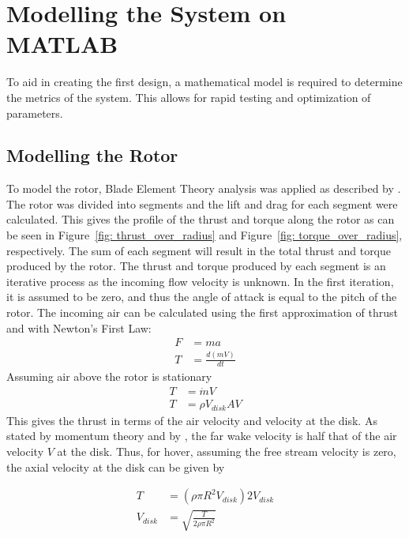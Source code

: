 \chapter{Modelling the System on MATLAB} \label{sec: MATLAB_Model}
    To aid in creating the first design, a mathematical model is required to determine the metrics of the system. This allows for rapid testing and optimization of parameters. 

    \section{Modelling the Rotor}
        To model the rotor, Blade Element Theory analysis was applied as described by \cite{blade_element_theory_2024}. The rotor was divided into segments and the lift and drag for each segment were calculated. This gives the profile of the thrust and torque along the rotor as can be seen in Figure~\ref{fig: thrust_over_radius} and Figure~\ref{fig: torque_over_radius}, respectively. The sum of each segment will result in the total thrust and torque produced by the rotor.
        The thrust and torque produced by each segment is an iterative process as the incoming flow velocity is unknown. In the first iteration, it is assumed to be zero, and thus the angle of attack is equal to the pitch of the rotor. The incoming air can be calculated using the first approximation of thrust and with Newton's First Law:
        \begin{align*}
            F & = ma\\
            T & = \frac{d(mV)}{dt}
        \end{align*}
        Assuming air above the rotor is stationary
        \begin{align*}
            T &= \dot{m}V\\
            T &= \rho V_{disk} A V
        \end{align*} 
        This gives the thrust in terms of the air velocity and velocity at the disk. As stated by momentum theory and by \cite{AflredAerodynamicsOfHelicopters}, the far wake velocity is half that of the air velocity \(V\) at the disk. Thus, for hover, assuming the free stream velocity is zero, the axial velocity at the disk can be given by

        \begin{align*}
            T &= (\rho \pi R^2 V_{disk} )2V_{disk}\\
            V_{disk} &= \sqrt{\frac{T}{2 \rho \pi R^2}}
        \end{align*}
        
